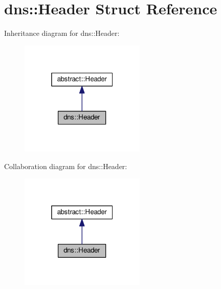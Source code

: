 \hypertarget{structdns_1_1Header}{}\section{dns\+:\+:Header Struct Reference}
\label{structdns_1_1Header}


Inheritance diagram for dns\+:\+:Header\+:
\nopagebreak
\begin{figure}[H]
\begin{center}
\leavevmode
\includegraphics[width=169pt]{structdns_1_1Header__inherit__graph}
\end{center}
\end{figure}


Collaboration diagram for dns\+:\+:Header\+:
\nopagebreak
\begin{figure}[H]
\begin{center}
\leavevmode
\includegraphics[width=169pt]{structdns_1_1Header__coll__graph}
\end{center}
\end{figure}
